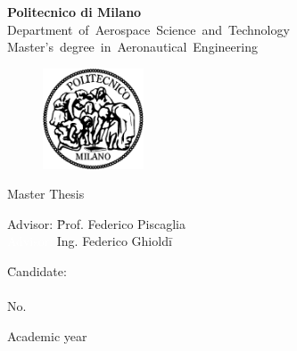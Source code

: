 \thispagestyle{empty} \cleardoublepage
\begin{center}
    \LARGE{\textbf{Politecnico di Milano}}\\
    \mbox{\large{Department of Aerospace Science and Technology}}\\
    \mbox{\Large{Master's degree in Aeronautical Engineering}}
\end{center}

\addvspace{1cm}
\begin{figure}[h]
    \centering
    \includegraphics*[width=3cm]{./utils/poli.eps}
\end{figure}

\addvspace{1cm}
\begin{center}
    \begin{Large}
        Master Thesis
    \end{Large}
    \vspace{1cm}
    
    \begin{huge}
        \textbf{\thesisTitle}
    \end{huge}
\end{center}

\addvspace{3cm}
\begin{Large}
    \begin{flushleft}
        \begin{tabbing}
            Advisor: \hspace{8pt}  \= Prof. Federico Piscaglia\\
            \textcolor{white}{Advisor:} \> Ing. Federico Ghioldi\= \+ \\
        \end{tabbing}
    \end{flushleft}

    \addvspace{1.5cm}
    \begin{flushright}
        \begin{tabbing}
            \hspace{300pt}
            \= Candidate:\\
            \> \candidateName\\
            \> No. \candidateNumber\\
        \end{tabbing}
    \end{flushright}

    \vfill
    \begin{center}
        Academic year \academicYear
    \end{center}

\end{Large}

\newpage 

\thispagestyle{empty}
\mbox{}

\newpage
